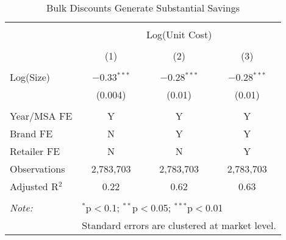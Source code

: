 
\begin{table}[!htbp] \centering 
  \caption{Bulk Discounts Generate Substantial Savings} 
  \label{tab:bulkDiscountUnitCost} 
\begin{tabular}{@{\extracolsep{5pt}}lccc} 
\\[-1.8ex]\hline 
\hline \\[-1.8ex] 
 & \multicolumn{3}{c}{Log(Unit Cost)} \\ 
\cline{2-4} 
\\[-1.8ex] & (1) & (2) & (3)\\ 
\hline \\[-1.8ex] 
 Log(Size) & $-$0.33$^{***}$ & $-$0.28$^{***}$ & $-$0.28$^{***}$ \\ 
  & (0.004) & (0.01) & (0.01) \\ 
 \hline \\[-1.8ex] 
Year/MSA FE & Y & Y & Y \\ 
Brand FE & N & Y & Y \\ 
Retailer FE & N & N & Y \\ 
Observations & 2,783,703 & 2,783,703 & 2,783,703 \\ 
Adjusted R$^{2}$ & 0.22 & 0.62 & 0.63 \\ 
\hline 
\hline \\[-1.8ex] 
\textit{Note:}  & \multicolumn{3}{l}{$^{*}$p$<$0.1; $^{**}$p$<$0.05; $^{***}$p$<$0.01} \\ 
 & \multicolumn{3}{l}{Standard errors are clustered at market level.} \\ 
\end{tabular} 
\end{table} 
